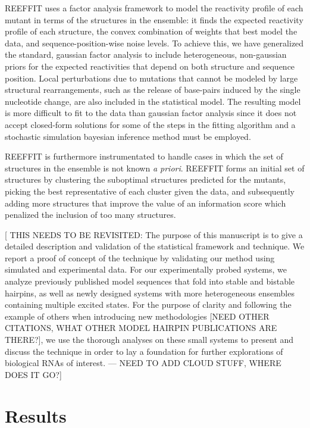 \documentclass[12pt]{article}
\begin{document}
REEFFIT uses a factor analysis framework to model the reactivity profile of each mutant in terms of the structures in the ensemble: it finds the expected reactivity profile of each structure, the convex combination of weights that best model the data, and sequence-position-wise noise levels.
To achieve this, we have generalized the standard, gaussian factor analysis to include heterogeneous, non-gaussian priors for the expected reactivities that depend on both structure and sequence position. 
Local perturbations due to mutations that cannot be modeled by large structural rearrangements, such as the release of base-pairs induced by the single nucleotide change, are also included in the statistical model.
The resulting model is more difficult to fit to the data than gaussian factor analysis since it does not accept closed-form solutions for some of the steps in the fitting algorithm and a stochastic simulation bayesian inference method must be employed.

REEFFIT is furthermore instrumentated to handle cases in which the set of structures in the ensemble is not known \textit{a priori}. REEFFIT forms an initial set of structures by clustering the suboptimal structures predicted for the mutants, picking the best representative of each cluster given the data, and subsequently adding more structures that improve the value of an information score which penalized the inclusion of too many structures.

[ THIS NEEDS TO BE REVISITED: The purpose of this manuscript is to give a detailed description and validation of the statistical framework and technique. 
We report a proof of concept of the technique by validating our method using simulated and experimental data. 
For our experimentally probed systems, we analyze previously published model sequences that fold into stable and bistable hairpins, as well as newly designed systems with more heterogeneous ensembles containing multiple excited states.
For the purpose of clarity and following the example of others when introducing new methodologies \cite{Ma2006} [NEED OTHER CITATIONS, WHAT OTHER MODEL HAIRPIN PUBLICATIONS ARE THERE?], we use the thorough analyses on these small systems to present and discuss the technique in order to lay a foundation for further explorations of biological RNAs of interest. --- NEED TO ADD CLOUD STUFF, WHERE DOES IT GO?] 


\section{Results}
\end{document}
